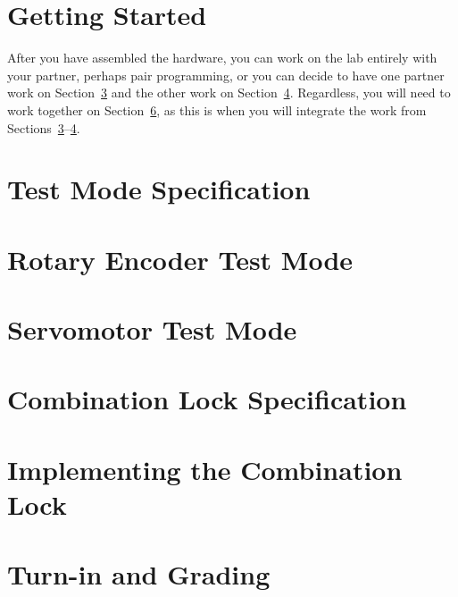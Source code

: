     \section{Getting Started} \label{sec:GettingStarted}                

    \vspace{1cm}

    After you have assembled the hardware, you can work on the lab entirely with your partner, perhaps pair programming,
    or you can decide to have one partner work on Section~\ref{sec:rotaryEncoder} and the other work on Section~\ref{sec:servo}.
    Regardless, you will need to work together on Section~\ref{sec:integration}, as this is when you will integrate the work from Sections~\ref{sec:rotaryEncoder}--\ref{sec:servo}.

    \section{Test Mode Specification} \label{sec:testMode}              

    \section{Rotary Encoder Test Mode} \label{sec:rotaryEncoder}        

    \section{Servomotor Test Mode} \label{sec:servo}                    

    \section{Combination Lock Specification} \label{sec:spec}           

    \section{Implementing the Combination Lock} \label{sec:integration} 

    \section{Turn-in and Grading}                                       

